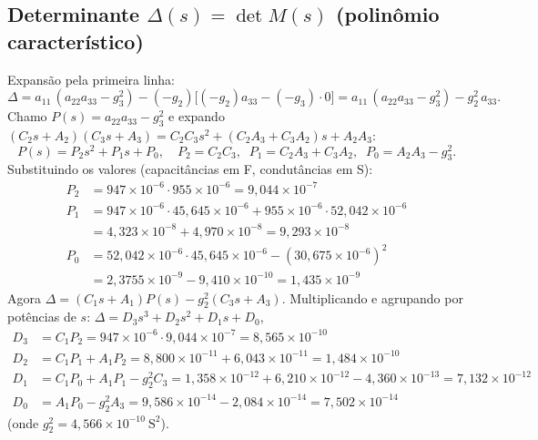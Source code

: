 \subsection{Determinante $\Delta(s)=\det M(s)$ (polinômio característico)}
Expansão pela primeira linha:
\[
\Delta=a_{11}\,(a_{22}a_{33}-g_3^2)-(-g_2)\big[(-g_2)a_{33}-(-g_3)\cdot0\big]=a_{11}\,(a_{22}a_{33}-g_3^2)-g_2^2\,a_{33}.
\]
Chamo $P(s)=a_{22}a_{33}-g_3^2$ e expando $(C_2s+A_2)(C_3s+A_3)=C_2C_3s^2+(C_2A_3+C_3A_2)s+A_2A_3$:
\[
P(s)=P_2s^2+P_1s+P_0,\quad P_2=C_2C_3,\;\; P_1=C_2A_3+C_3A_2,\;\; P_0=A_2A_3-g_3^2 .
\]
Substituindo os valores (capacitâncias em F, condutâncias em S):
\begin{align*}
P_2&=947\!\times\!10^{-6}\cdot955\!\times\!10^{-6}=9{,}044\times10^{-7}\\
P_1&=947\!\times\!10^{-6}\cdot45{,}645\!\times\!10^{-6}+955\!\times\!10^{-6}\cdot52{,}042\!\times\!10^{-6}\\&=4{,}323\times10^{-8}+4{,}970\times10^{-8}=9{,}293\times10^{-8}\\
P_0&=52{,}042\!\times\!10^{-6}\cdot45{,}645\!\times\!10^{-6}-(30{,}675\!\times\!10^{-6})^2\\&=2{,}3755\times10^{-9}-9{,}410\times10^{-10}=1{,}435\times10^{-9}
\end{align*}
Agora $\Delta=(C_1s+A_1)P(s)-g_2^2(C_3s+A_3)$. Multiplicando e agrupando por potências de $s$: $\Delta=D_3s^3+D_2s^2+D_1s+D_0$,
\begin{align*}
D_3&=C_1P_2=947\!\times\!10^{-6}\cdot9{,}044\!\times\!10^{-7}=8{,}565\times10^{-10}\\
D_2&=C_1P_1+A_1P_2=8{,}800\times10^{-11}+6{,}043\times10^{-11}=1{,}484\times10^{-10}\\
D_1&=C_1P_0+A_1P_1-g_2^2C_3=1{,}358\times10^{-12}+6{,}210\times10^{-12}-4{,}360\times10^{-13}=7{,}132\times10^{-12}\\
D_0&=A_1P_0-g_2^2A_3=9{,}586\times10^{-14}-2{,}084\times10^{-14}=7{,}502\times10^{-14}
\end{align*}
(onde $g_2^2=4{,}566\times10^{-10}\ \mathrm{S^2}$).

